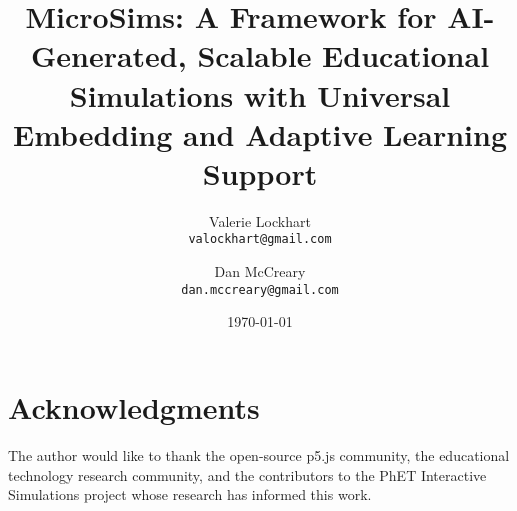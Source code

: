 \documentclass[11pt]{article}
\title{MicroSims: A Framework for AI-Generated, Scalable Educational Simulations with Universal Embedding and Adaptive Learning Support}
\author{
    Valerie Lockhart \\
    \texttt{valockhart@gmail.com}
    \and
    Dan McCreary \\
    \texttt{dan.mccreary@gmail.com}
}
\date{\today}
\begin{document}
\maketitle














\section*{Acknowledgments}
The author would like to thank the open-source p5.js community, the educational technology research community, and the contributors to the PhET Interactive Simulations project whose research has informed this work.



\end{document}
